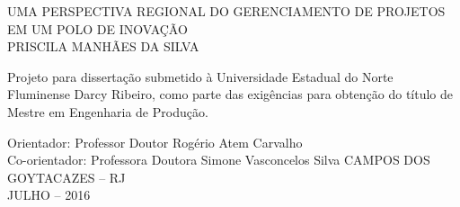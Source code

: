 \begin{titlepage}
 \begin{center}
   {\large UMA PERSPECTIVA REGIONAL DO GERENCIAMENTO DE PROJETOS EM UM POLO DE INOVAÇÃO} \\ [3.5cm]
   {\large PRISCILA MANHÃES DA SILVA} \\ [1.5cm]
   \hspace{.45\textwidth} %
   \begin{minipage}{0.5\textwidth}
   \begin{espacosimples}
        Projeto para dissertação submetido à Universidade Estadual do Norte Fluminense Darcy Ribeiro, como parte das exigências para obtenção do título de Mestre em Engenharia de Produção. \\[5cm]
    \end{espacosimples}
    \end{minipage}
    {\normalsize Orientador: Professor Doutor Rogério Atem Carvalho}\\
    {\normalsize Co-orientador: Professora Doutora Simone Vasconcelos Silva}
   \vfill
   {\large CAMPOS DOS GOYTACAZES – RJ} \\
   {\large JULHO – 2016}
 \end{center}
\end{titlepage}
